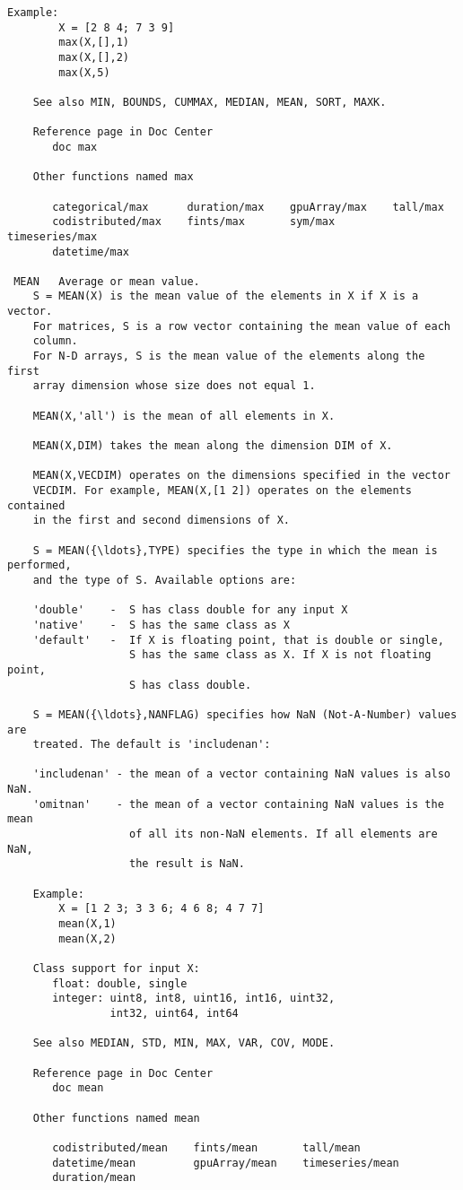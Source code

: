 \documentclass[11pt]{article}
\begin{document}
\begin{Verbatim}[commandchars=\\\{\}]
    Example: 
        X = [2 8 4; 7 3 9]
        max(X,[],1)
        max(X,[],2)
        max(X,5)
 
    See also MIN, BOUNDS, CUMMAX, MEDIAN, MEAN, SORT, MAXK.

    Reference page in Doc Center
       doc max

    Other functions named max

       categorical/max      duration/max    gpuArray/max    tall/max
       codistributed/max    fints/max       sym/max         timeseries/max
       datetime/max

 MEAN   Average or mean value.
    S = MEAN(X) is the mean value of the elements in X if X is a vector. 
    For matrices, S is a row vector containing the mean value of each 
    column. 
    For N-D arrays, S is the mean value of the elements along the first 
    array dimension whose size does not equal 1.
 
    MEAN(X,'all') is the mean of all elements in X.
 
    MEAN(X,DIM) takes the mean along the dimension DIM of X.
 
    MEAN(X,VECDIM) operates on the dimensions specified in the vector 
    VECDIM. For example, MEAN(X,[1 2]) operates on the elements contained
    in the first and second dimensions of X.
 
    S = MEAN({\ldots},TYPE) specifies the type in which the mean is performed, 
    and the type of S. Available options are:
 
    'double'    -  S has class double for any input X
    'native'    -  S has the same class as X
    'default'   -  If X is floating point, that is double or single,
                   S has the same class as X. If X is not floating point, 
                   S has class double.
 
    S = MEAN({\ldots},NANFLAG) specifies how NaN (Not-A-Number) values are 
    treated. The default is 'includenan':
 
    'includenan' - the mean of a vector containing NaN values is also NaN.
    'omitnan'    - the mean of a vector containing NaN values is the mean 
                   of all its non-NaN elements. If all elements are NaN,
                   the result is NaN.
 
    Example:
        X = [1 2 3; 3 3 6; 4 6 8; 4 7 7]
        mean(X,1)
        mean(X,2)
 
    Class support for input X:
       float: double, single
       integer: uint8, int8, uint16, int16, uint32,
                int32, uint64, int64
 
    See also MEDIAN, STD, MIN, MAX, VAR, COV, MODE.

    Reference page in Doc Center
       doc mean

    Other functions named mean

       codistributed/mean    fints/mean       tall/mean
       datetime/mean         gpuArray/mean    timeseries/mean
       duration/mean


    \end{Verbatim}
\end{document}
